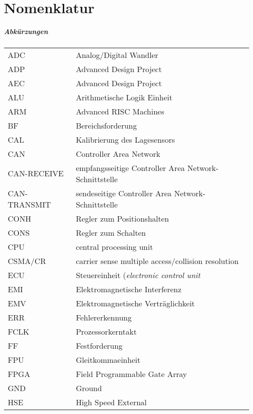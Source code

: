 \chapter*{Nomenklatur}
\paragraph{Abk\"urzungen}
\begin{table}[H]
	\centering
		\begin{tabular}{p{3cm}p{15cm}}
			ADC \dotfill & Analog/Digital Wandler\\
			ADP \dotfill & Advanced Design Project\\
			AEC \dotfill & Advanced Design Project\\
			ALU \dotfill & Arithmetische Logik Einheit\\
			ARM\dotfill & Advanced RISC Machines\\
			BF\dotfill & Bereichsforderung\\
			CAL\dotfill & Kalibrierung des Lagesensors\\
			CAN\dotfill & Controller Area Network\\
			CAN-RECEIVE\dotfill & empfangsseitige Controller Area Network-Schnittstelle\\
			CAN-TRANSMIT\dotfill & sendeseitige Controller Area Network-Schnittstelle\\
			CONH\dotfill & Regler zum Positionshalten\\
			CONS\dotfill & Regler zum Schalten\\
			CPU\dotfill & central processing unit\\
			CSMA/CR\dotfill & carrier sense multiple access/collision resolution\\
			ECU\dotfill & Steuereinheit (\textit{electronic control unit}\\
			EMI\dotfill & Elektromagnetische Interferenz\\
			EMV\dotfill & Elektromagnetische Verträglichkeit\\
			ERR\dotfill & Fehlererkennung\\
			FCLK\dotfill & Prozessorkerntakt\\
			FF\dotfill & Festforderung\\
			FPU\dotfill & Gleitkommaeinheit\\
			FPGA\dotfill & Field Programmable Gate Array\\
			GND\dotfill & Ground\\
			HSE\dotfill & High Speed External\\

\end{tabular}
\end{table}
